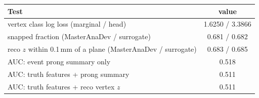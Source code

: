\begin{tabular}{lc}
\toprule
Test & value \\
\midrule
vertex class log loss (marginal / head) & 1.6250 / 3.3866 \\
snapped fraction (MasterAnaDev / surrogate) & 0.681 / 0.682 \\
reco $z$ within 0.1\,mm of a plane (MasterAnaDev / surrogate) & 0.683 / 0.685 \\
\midrule
AUC: event prong summary only & 0.518 \\
AUC: truth features + prong summary & 0.511 \\
AUC: truth features + reco vertex $z$ & 0.511 \\
\bottomrule
\end{tabular}
